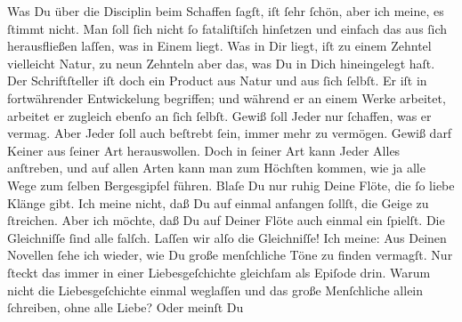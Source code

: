 \pstart
           Was Du über die Disciplin beim Schaffen ſagſt, iſt ſehr ſchön, aber ich meine, es
               ſtimmt nicht. Man ſoll ſich nicht ſo fataliſtiſch hinſetzen\strikeout{,} und einfach das aus ſich herausfließen laſſen, was in Einem liegt. Was in
               Dir liegt, iſt zu einem Zehntel vielleicht Natur, zu  neun Zehnteln aber das, was Du in Dich hineingelegt haſt. Der
               Schriftſteller iſt doch ein Product aus Natur und aus ſich ſelbſt. Er iſt in
               fortwährender Entwickelung begriffen; und {\pb}während
               er an einem Werke arbeitet, \strikeout{\textcolor{gray}{×}{ }\textcolor{gray}{arb}} arbeitet er zugleich ebenſo an ſich ſelbſt. Gewiß ſoll Jeder nur ſchaffen, was
               er vermag. Aber Jeder ſoll auch beſtrebt ſein, 
               immer mehr zu vermögen. Gewiß darf Keiner aus ſeiner Art herauswollen. Doch in ſeiner
               Art kann Jeder Alles anſtreben, und auf allen Arten kann man zum Höchſten kommen, wie
                   ja alle Wege zum ſelben Bergesgipfel führen.
               Blaſe Du nur ruhig Deine Flöte, die ſo liebe Klänge gibt. Ich meine  nicht, daß Du auf einmal anfangen ſollſt, die
               Geige zu ſtreichen. Aber ich möchte, daß Du auf Deiner Flöte auch  einmal ein \label{K_L02861-2v}\label{K_L02861-2} ſpielſt. Die Gleichniſſe ſind alle falſch. Laſſen wir alſo die Gleichniſſe!
               Ich meine: Aus Deinen Novellen
               ſehe ich wieder,  wie Du große menſchliche Töne zu finden vermagſt. Nur ſteckt das immer in
               einer Liebesgeſchichte gleichſam als Epiſode drin. Warum nicht die Liebesgeſchichte
               einmal weglaſſen und das große Menſchliche \strikeout{\textcolor{gray}{al}}{ } allein ſchreiben, ohne alle Liebe? Oder meinſt Du

